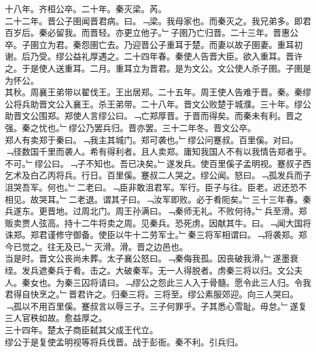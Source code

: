 \documentclass{zhvt-classic}
\begin{document}
\hspace*{2em}十八年。齐桓公卒。二十年。秦灭梁。芮。\\
\hspace*{2em}二十二年。晋公子圉闻晋君病。曰。﹁梁。我母家也。而秦灭之。我兄弟多。即君百岁后。秦必留我。而晋轻。亦更立他子。﹂子圉乃亡归晋。二十三年。晋惠公卒。子圉立为君。秦怨圉亡去。乃迎晋公子重耳于楚。而妻以故子圉妻。重耳初谢。后乃受。缪公益礼厚遇之。二十四年春。秦使人告晋大臣。欲入重耳。晋许之。于是使人送重耳。二月。重耳立为晋君。是为文公。文公使人杀子圉。子圉是为怀公。\\
\hspace*{2em}其秋。周襄王弟带以翟伐王。王出居郑。二十五年。周王使人告难于晋。秦。秦缪公将兵助晋文公入襄王。杀王弟带。二十八年。晋文公败楚于城濮。三十年。缪公助晋文公围郑。郑使人言缪公曰。﹁亡郑厚晋。于晋而得矣。而秦未有利。晋之强。秦之忧也。﹂缪公乃罢兵归。晋亦罢。三十二年冬。晋文公卒。\\
\hspace*{2em}郑人有卖郑于秦曰。﹁我主其城门。郑可袭也。﹂缪公问蹇叔。百里傒。对曰。﹁径数国千里而袭人。希有得利者。且人卖郑。庸知我国人不有以我情告郑者乎。不可。﹂缪公曰。﹁子不知也。吾已决矣。﹂遂发兵。使百里傒子孟明视。蹇叔子西乞术及白乙丙将兵。行日。百里傒。蹇叔二人哭之。缪公闻。怒曰。﹁孤发兵而子沮哭吾军。何也。﹂二老曰。﹁臣非敢沮君军。军行。臣子与往。臣老。迟还恐不相见。故哭耳。﹂二老退。谓其子曰。﹁汝军即败。必于肴阨矣。﹂三十三年春。秦兵遂东。更晋地。过周北门。周王孙满曰。﹁秦师无礼。不败何待。﹂兵至滑。郑贩卖贾人弦高。持十二牛将卖之周。见秦兵。恐死虏。因献其牛。曰。﹁闻大国将诛郑。郑君谨修守御备。使臣以牛十二劳军士。﹂秦三将军相谓曰。﹁将袭郑。郑今已觉之。往无及已。﹂灭滑。滑。晋之边邑也。\\
\hspace*{2em}当是时。晋文公丧尚未葬。太子襄公怒曰。﹁秦侮我孤。因丧破我滑。﹂遂墨衰绖。发兵遮秦兵于肴。击之。大破秦军。无一人得脱者。虏秦三将以归。文公夫人。秦女也。为秦三囚将请曰。﹁缪公之怨此三人入于骨髓。愿令此三人归。令我君得自快烹之。﹂晋君许之。归秦三将。三将至。缪公素服郊迎。向三人哭曰。﹁孤以不用百里傒。蹇叔言以辱三子。三子何罪乎。子其悉心雪耻。毋怠。﹂遂复三人官秩如故。愈益厚之。\\
\hspace*{2em}三十四年。楚太子商臣弑其父成王代立。\\
\hspace*{2em}缪公于是复使孟明视等将兵伐晋。战于彭衙。秦不利。引兵归。\\
\end{document}
